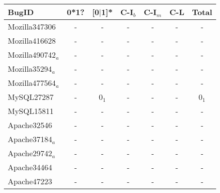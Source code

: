 \begin{table}
  \centering
  \small
  \newcommand{\Yes}[0]{\checkmark}
  \newcommand{\No}[0]{-}
  \begin{tabular}{lcccccc}
    \toprule
   {\bf BugID}           &  {\bf 0*1?}          &  {\bf [0$|$1]*}             &{\bf C-I$_b$}            &{\bf C-I$_m$}          &   {\bf C-L}     & {\bf Total}  \\
   \midrule
   Mozilla347306         &   -                  & -                           & -                       & -                     &   -             & -\\
   Mozilla416628         &   -                  & -                           & -                       & -                     &   -             & -\\
   Mozilla490742$_a$     &   -                  & -                           & -                       & -                     &   -             & -\\
   Mozilla35294$_a$      &   -                  & -                           & -                       & -                     &   -             & -\\ 
   Mozilla477564$_a$     &   -                  & -                           & -                       & -                     &   -             & -\\
   \midrule 
   MySQL27287            &   -                  & 0$_1$                       & -                       & -                     &   -             & 0$_1$\\
   MySQL15811            &   -                  & -                           & -                       & -                     &   -             & -\\ 
   \midrule    
   Apache32546           &   -                  & -                           & -                       & -                     &   -             & -\\
   Apache37184$_a$       &   -                  & -                           & -                       & -                     &   -             & -\\
   Apache29742$_a$       &   -                  & -                           & -                       & -                     &   -             & -\\ 
   Apache34464           &   -                  & -                           & -                       & -                     &   -             & -\\
   Apache47223           &   -                  & -                           & -                       & -                     &   -             & -\\

\end{tabular}
\end{table}
